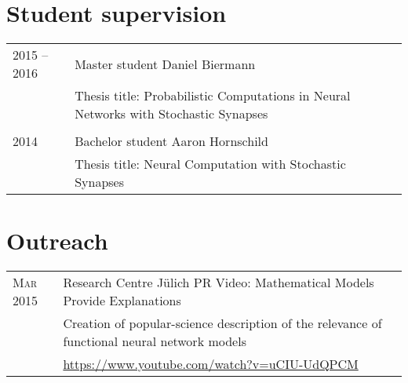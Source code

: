 \documentclass[a4paper,10pt]{article}
\begin{document}
\section{Student supervision}
\begin{longtable}{>{\hfill}p{1.8cm}|p{11.4cm}}
  2015 -- 2016 & Master student Daniel Biermann \\
  & \footnotesize  Thesis title: Probabilistic Computations in Neural Networks with Stochastic Synapses \\
  \multicolumn{2}{c}{} \\
  2014 & Bachelor student Aaron Hornschild \\
  & \footnotesize Thesis title: Neural Computation with Stochastic Synapses \\
\end{longtable}

\section{Outreach}
\begin{longtable}{>{\hfill}p{3.15cm}|p{10.4cm}}
  \textsc{Mar} 2015 & Research Centre J\"ulich PR Video: Mathematical Models Provide Explanations \\
                    & \footnotesize Creation of popular-science description of the relevance of functional neural network models \\
                    & \footnotesize \href{https://www.youtube.com/watch?v=uCIU-UdQPCM}{https://www.youtube.com/watch?v=uCIU-UdQPCM}
\end{longtable}

\newpage

\newif\ifpublications
\publicationstrue

\ifpublications

\fi
\end{document}
